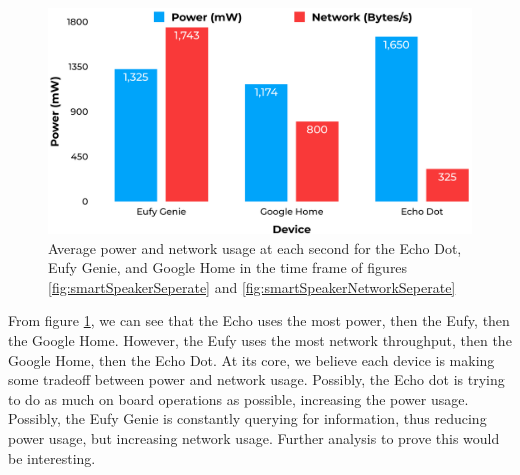 \begin{figure}[H]
    \centering
    \includegraphics[width=1\textwidth]{figures/smartSpeakerComparison.png}
    \caption{Average power and network usage at each second for the Echo Dot, Eufy Genie, and Google Home in the time frame of figures \ref{fig:smartSpeakerSeperate} and \ref{fig:smartSpeakerNetworkSeperate}}
    \label{fig:smartSpeakerComparison}
  \end{figure}


From figure \ref{fig:smartSpeakerComparison}, we can see that the Echo uses the most power, then the Eufy, then the Google Home. However, the Eufy uses the most network throughput, then the Google Home, then the Echo Dot. At its core, we believe each device is making some tradeoff between power and network usage. Possibly, the Echo dot is trying to do as much on board operations as possible, increasing the power usage. Possibly, the Eufy Genie is constantly querying for information, thus reducing power usage, but increasing network usage. Further analysis to prove this would be interesting.
